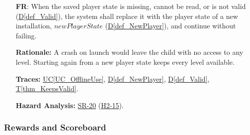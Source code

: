 \documentclass[12pt]{article}
\newcommand{\ucref}[1]{\hyperref[#1]{UC\ref*{#1}}}
\newcounter{reqnum} %
\newcommand{\thmref}[1]{\hyperref[#1]{T\ref*{#1}}}
\newcommand{\defref}[1]{\hyperref[#1]{D\ref*{#1}}}
\newcommand{\haurl}{https://team-hindsight.github.io/ophthamology-game/HazardAnalysis/HazardAnalysis.pdf}
\newcommand{\hasrref}[2]{\href{\haurl\#nameddest=sr:#1}{SR-#2}}
\newcommand{\hahazref}[2]{\href{\haurl\#nameddest=haz:#1}{H#2}}
\newcommand{\hazsr}[4]{\hasrref{#1}{#2} (\hahazref{#3}{#4})}
\begin{document}
\begin{itemize}
\textbf{Rationale:} The child's progress and rewards must survive the
application closing. Saving after every change means at most the current input
can be lost. Keeping the previous save when a save fails means a failure never
replaces valid progress with damaged data. \thmref{thm_KeepsValid} shows that every saved state is valid.

\textbf{Traces:} \ucref{UC_ExitGame}, \ucref{UC_OfflineUse},
\defref{def_Player}, \thmref{thm_KeepsValid}.

\textbf{Hazard Analysis:} \hazsr{ReliableSaveData}{20}{SaveDataCorruption}{2-15}.

\item[\refstepcounter{reqnum}\textbf{FR\thereqnum}\label{FR_CorruptData}:]
When the saved player state is missing, cannot be read, or is not valid
(\defref{def_Valid}), the system shall replace it with the player state of a
new installation, $\mathit{newPlayerState}$ (\defref{def_NewPlayer}), and
continue without failing.

\textbf{Rationale:} A crash on launch would leave the child with no access to
any level. Starting again from a new player state keeps every level available.

\textbf{Traces:} \ucref{UC_OfflineUse}, \defref{def_NewPlayer},
\defref{def_Valid}, \thmref{thm_KeepsValid}.

\textbf{Hazard Analysis:} \hazsr{ReliableSaveData}{20}{SaveDataCorruption}{2-15}.

\end{itemize}

\subsubsection{Rewards and Scoreboard}
\label{sec_FRRewards}
\end{document}
